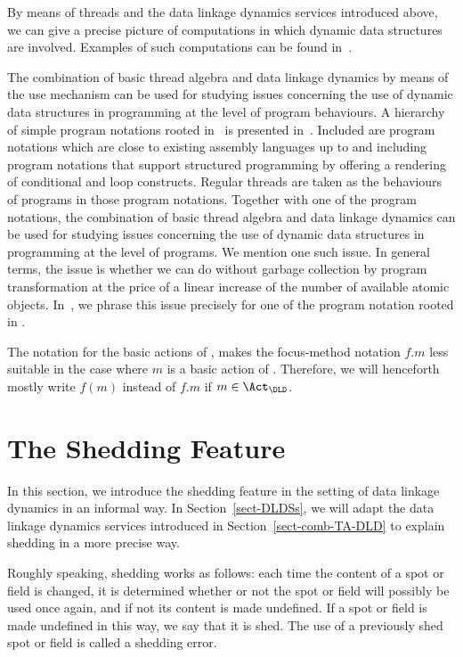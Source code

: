 \documentclass[fleqn]{llncs}
\begin{document}
By means of threads and the data linkage dynamics services introduced
above, we can give a precise picture of computations in which dynamic
data structures are involved.
Examples of such computations can be found in~\cite{BM08d}.

The combination of basic thread algebra and data linkage dynamics by
means of the use mechanism can be used for studying issues concerning
the use of dynamic data structures in programming at the level of
program behaviours.
A hierarchy of simple program notations rooted in \PGA\ is presented
in~\cite{BL02a}.
Included are program notations which are close to existing assembly
languages up to and including program notations that support structured
programming by offering a rendering of conditional and loop constructs.
Regular threads are taken as the behaviours of programs in those program
notations.
Together with one of the program notations, the combination of basic
thread algebra and data linkage dynamics can be used for studying issues
concerning the use of dynamic data structures in programming at the
level of programs.
We mention one such issue.
In general terms, the issue is whether we can do without garbage
collection by program transformation at the price of a linear increase
of the number of available atomic objects.
In~\cite{BM08d}, we phrase this issue precisely for one of the program
notation rooted in \PGA.

The notation for the basic actions of \DLD, makes the focus-method
notation $f.m$ less suitable in the case where $m$ is a basic action of
\DLD.
Therefore, we will henceforth mostly write $f(m)$ instead of $f.m$ if
$m \in \Act_\DLD$.

\section{The Shedding Feature}
\label{sect-shedding}

In this section, we introduce the shedding feature in the setting of
data linkage dynamics in an informal way.
In Section~\ref{sect-DLDSs}, we will adapt the data linkage dynamics
services introduced in Section~\ref{sect-comb-TA-DLD} to explain
shedding in a more precise way.

Roughly speaking, shedding works as follows: each time the content of a
spot or field is changed, it is determined whether or not the spot or
field will possibly be used once again, and if not its content is made
undefined.
If a spot or field is made undefined in this way, we say that it is
shed.
The use of a previously shed spot or field is called a shedding error.
\end{document}
